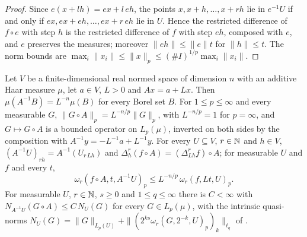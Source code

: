 \begin{proof}
\leanok
{}
Since $e(x + lh) = e x + l \, e h$, the points $x, x + h, \dots, x + rh$ lie in $e^{-1}U$ if and
only if $e x, e x + e h, \dots, e x + r \, e h$ lie in $U$. Hence the restricted difference of
$f \circ e$ with step $h$ is the restricted difference of $f$ with step $e h$, composed with $e$,
and $e$ preserves the measures; moreover $\|e h\| \leq \|e\| t$ for $\|h\| \leq t$. The norm
bounds are $\max_i \|x_i\| \leq \|x\|_p \leq (\# I)^{1/p} \max_i \|x_i\|$.
\end{proof}

\begin{lemma}
\label{lem:modulus-on-affine}
\leanok
{}
Let $V$ be a finite-dimensional real normed space of dimension $n$ with an additive Haar
measure $\mu$, let $a \in V$, $L > 0$ and $A x = a + L x$. Then $\mu(A^{-1} B) = L^{-n} \mu(B)$
for every Borel set $B$. For $1 \leq p \leq \infty$ and every measurable $G$,
$\|G \circ A\|_p = L^{-n/p} \|G\|_p$, with $L^{-n/p} = 1$ for $p = \infty$, and
$G \mapsto G \circ A$ is a bounded operator on $L_p(\mu)$, inverted on both sides by the
composition with $A^{-1} y = -L^{-1} a + L^{-1} y$. For every
$U \subseteq V$, $r \in \mathbb{N}$ and $h \in V$, $(A^{-1}U)_{rh} = A^{-1}(U_{r\,Lh})$ and
$\Delta_h^r (f \circ A) = (\Delta_{Lh}^r f) \circ A$; for measurable $U$ and $f$ and every $t$,
\[
  \omega_r(f \circ A, t, A^{-1}U)_p \leq L^{-n/p} \, \omega_r(f, L t, U)_p .
\]
For measurable $U$, $r \in \mathbb{N}$, $s \geq 0$ and $1 \leq q \leq \infty$ there is $C < \infty$ with
$N_{A^{-1}U}(G \circ A) \leq C \, N_U(G)$ for every $G \in L_p(\mu)$, with the intrinsic
quasi-norms
$N_U(G) = \|G\|_{L_p(U)} + \|(2^{ks} \omega_r(G, 2^{-k}, U)_p)_k\|_{\ell_q}$ of
.
\end{lemma}

